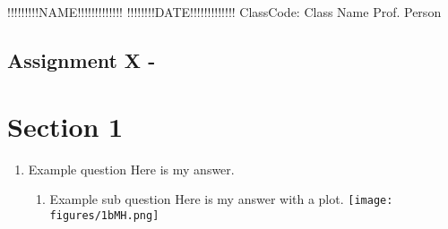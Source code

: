 \documentclass[12pt]{article}
\begin{document}
\noindent !!!!!!!!!NAME!!!!!!!!!!!!!
\newline 
\noindent !!!!!!!!DATE!!!!!!!!!!!!!
\newline 
\noindent ClassCode: Class Name
\newline 
\noindent Prof. Person


\begin{center}
    \subsection*{Assignment X - }
\end{center}

\section*{Section 1}
\begin{enumerate}
    \item Example question \newline 
    Here is my answer. \newline
    \begin{enumerate}
        \item Example sub question \newline
        Here is my answer with a plot. \newline \texttt{[image: figures/1bMH.png]}
    \end{enumerate}
\end{enumerate}



\end{document}
